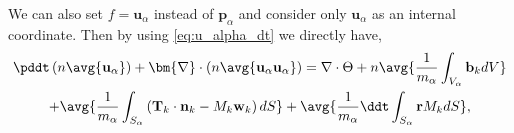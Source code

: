 We can also set $f = \textbf{u}_\alpha$ instead of $\textbf{p}_\alpha$ and consider only $\textbf{u}_\alpha$ as an internal coordinate.
Then by using \ref{eq:u_alpha_dt} we directly have, 
\begin{multline*}
    \pddt \left( n \avg{\textbf{u}_\alpha}\right)
    + \bm{\nabla} \cdot \left(n \avg{\textbf{u}_\alpha \textbf{u}_\alpha }\right)
    = 
    \nabla \cdot \Theta
    + n\avg{\frac{1}{m_\alpha}\int_{V_\alpha} \textbf{b}_k dV} \\
    + \avg{\frac{1}{m_\alpha}\int_{S_\alpha} \left(
    \textbf{T}_k\cdot\textbf{n}_k
    - M_k \textbf{w}_k
    \right)dS}
    + \avg{\frac{1}{m_\alpha} \ddt \int_{S_\alpha} 
        \textbf{r} M_k dS},
\end{multline*}


